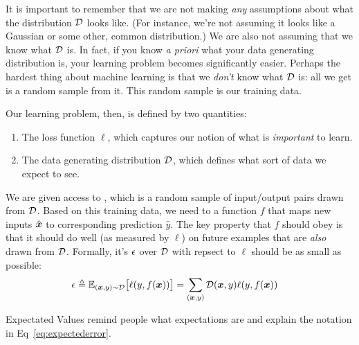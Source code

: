 It is important to remember that we are not making \emph{any}
assumptions about what the distribution $\mathcal{D}$ looks like.  (For
instance, we're not assuming it looks like a Gaussian or some other,
common distribution.)  We are also not assuming that we know what
$\mathcal{D}$ is.  In fact, if you know \emph{a priori} what your data
generating distribution is, your learning problem becomes
significantly easier.  Perhaps the hardest thing about machine
learning is that we \emph{don't} know what $\mathcal{D}$ is: all we get is a
random sample from it.  This random sample is our training data.

Our learning problem, then, is defined by two quantities:

\begin{enumerate}
\item The loss function $\ell$, which captures our notion of what is
  \emph{important} to learn.

\item The data generating distribution $\mathcal{D}$, which defines what sort
  of data we expect to see.
\end{enumerate}

We are given access to , which is a random
sample of input/output pairs drawn from $\mathcal{D}$.  Based on this training
data, we need to  a function $f$ that maps new inputs
$\hat {{\boldsymbol{x}}}$ to corresponding prediction $\hat y$.  The key property
that $f$ should obey is that it should do well (as measured by $\ell$)
on future examples that are \emph{also} drawn from $\mathcal{D}$.  Formally,
it's  $\epsilon$ over $\mathcal{D}$ with repsect to $\ell$
should be as small as possible:
\begin{align} \label{eq:expectederror}
\epsilon
&\triangleq
\mathbb{E}_{({\boldsymbol{x}},y) \sim \mathcal{D}} \big[ \ell(y, f({\boldsymbol{x}})) \big]
=
\sum_{({\boldsymbol{x}},y)} \mathcal{D}({\boldsymbol{x}},y) \ell(y, f({\boldsymbol{x}}))
\end{align}

\begin{mathreview}{Expectated Values}
  remind people what expectations are and explain the notation in
  Eq~\eqref{eq:expectederror}.
\end{mathreview}

